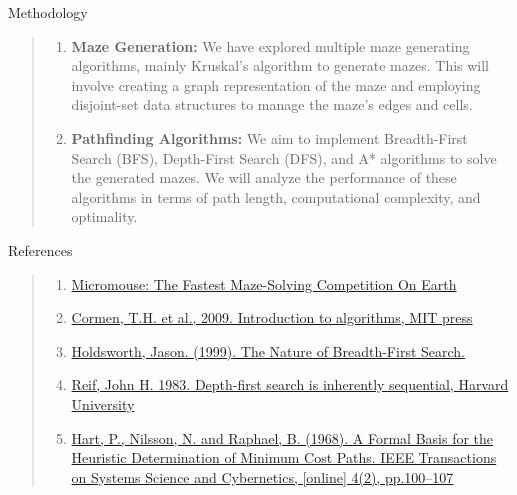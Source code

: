 \documentclass{amsart}
\begin{document}
\begin{section}{Methodology}
    \begin{quote}
        \begin{enumerate}
            \item \textbf{Maze Generation:} We have explored multiple maze generating algorithms, mainly Kruskal's algorithm to generate mazes. This will involve creating a graph representation of the maze and employing disjoint-set data structures to manage the maze's edges and cells. 
            \item \textbf{Pathfinding Algorithms:} We aim to implement Breadth-First Search (BFS), Depth-First Search (DFS), and A* algorithms to solve the generated mazes. We will analyze the performance of these algorithms in terms of path length, computational complexity, and optimality.
        \end{enumerate}
    \end{quote}
\end{section}

\begin{section}{References}

    \begin{quote}
        \begin{enumerate}
            \item \href{https://www.youtube.com/watch?v=ZMQbHMgK2rw}{Micromouse: The Fastest Maze-Solving Competition On Earth}
            \item \href{https://dahlan.unimal.ac.id/files/ebooks/2009%20Introduction%20to%20Algorithms%20Third%20Ed.pdf}{Cormen, T.H. et al., 2009. Introduction to algorithms, MIT press}
            \item \href{https://www.researchgate.net/profile/Jason-Holdsworth/publication/2727226_The_Nature_of_Breadth-First_Search/links/5539d8d70cf2239f4e7dad9d/The-Nature-of-Breadth-First-Search.pdf}{Holdsworth, Jason. (1999). The Nature of Breadth-First Search. }
            \item \href{https://users.cs.duke.edu/~reif/paper/dfs.ptime.pdf}{Reif, John H. 1983. Depth-first search is inherently sequential, Harvard University}
            \item \href{https://ieeexplore.ieee.org/document/4082128}{Hart, P., Nilsson, N. and Raphael, B. (1968). A Formal Basis for the Heuristic Determination of Minimum Cost Paths. IEEE Transactions on Systems Science and Cybernetics, [online] 4(2), pp.100–107}

        \end{enumerate}
    \end{quote}
    
\end{section}
\end{document}
